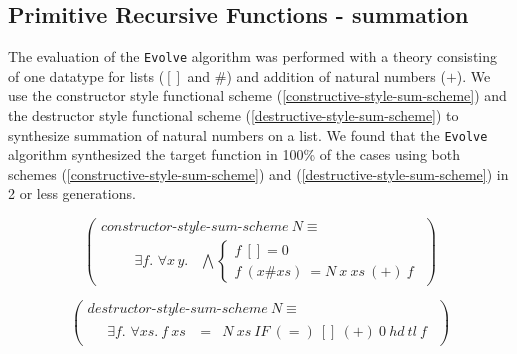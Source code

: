 \subsection{Primitive Recursive Functions - summation}
The evaluation of the {\tt Evolve} algorithm was performed with a theory consisting of one datatype for lists ($[]$ and $\#$) and addition of natural numbers ($+$). We use the constructor style functional scheme (\ref{constructive-style-sum-scheme}) and the destructor style functional scheme (\ref{destructive-style-sum-scheme}) to synthesize summation of natural numbers on a list. We found that the {\tt Evolve} algorithm synthesized the target function in 100\% of the cases using both schemes (\ref{constructive-style-sum-scheme}) and (\ref{destructive-style-sum-scheme}) in 2 or less generations.

\begin{equation}
  \left(\begin{array}{l}
    constructor\textrm{-}style\textrm{-}sum\textrm{-}scheme\ N \equiv \\
    \quad \quad \begin{array}{c}
      \exists f.\,\, \forall x\, y. \phantom{,}
    \end{array}
    \bigwedge \left\{
    \begin{array}{l}
      f\ [] = 0\\
      f\ (x \# xs)\ = N\ x\ xs\ (+)\ f
    \end{array}
    \right.
  \end{array}\right)
  \label{constructive-style-sum-scheme}
\end{equation}

\begin{equation}
  \left(\begin{array}{l}
    destructor\textrm{-}style\textrm{-}sum\textrm{-}scheme\ N \equiv \\
    \quad \begin{array}{rcl}
      \exists f.\,\, \forall xs.\ f\ xs\ & = & N\ xs\ IF\ (=)\ []\ (+)\ 0\ hd\ tl\ f
    \end{array}
  \end{array}\right)
  \label{destructive-style-sum-scheme}
\end{equation}

